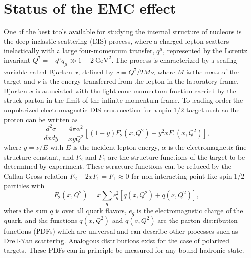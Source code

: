 \section{Status of the EMC effect\label{sec:status}}
%
One of the best tools available for studying the internal structure of nucleons is the deep inelastic
scattering (DIS) process, where a charged lepton scatters inelastically with a large four-momentum
transfer, $q^\mu$, represented by the Lorentz invariant $Q^2 = -q^\mu q_\mu \gg 1-2~\mathrm{GeV}^2$.
The process is characterized by a scaling variable called Bjorken-$x$, defined by $x = Q^2/2M \nu$, 
where $M$ is the mass of the target and $\nu$ is the energy transferred from the lepton in the laboratory frame. Bjorken-$x$ is associated with the light-cone momentum fraction carried by the struck parton in the limit of the infinite-momentum frame. To leading order the unpolarized electromagnetic DIS cross-section for a spin-1/2 target such as the proton can be written as~\cite{PhysRevD.98.030001}
%
\begin{equation}
\frac{d^2 \sigma}{dx dy} = \frac{4 \pi \alpha^2}{x y Q^2} \left[ (1-y)F_2(x, Q^2) + y^2 x F_1(x, Q^2) \right],
\end{equation}
%
where $y = \nu/E$ with $E$ is the incident lepton energy, $\alpha$ is the electromagnetic fine structure constant, and $F_2$
and $F_1$ are the structure functions of the target to be determined by experiment. These structure functions can be reduced by the Callan-Gross relation $F_2 - 2xF_1 = F_\mathrm{L} \approx 0$ for non-interacting point-like spin-1/2 particles with
%
\begin{equation}
F_2(x,Q^2) = x \sum_{q} e_q^2 \left[q(x,Q^2) + \bar{q}(x,Q^2)\right],
\end{equation}
where the sum $q$ is over all quark flavors,  $e_q$ is the electromagnetic charge of the quark, and the
functions $q(x,Q^2)$ and $\bar{q}(x,Q^2)$ are the parton distribution functions (PDFs) which are universal and can describe other processes such as Drell-Yan scattering.  Analogous distributions exist for the case of polarized targets. These PDFs can in principle be measured for any bound hadronic state.

